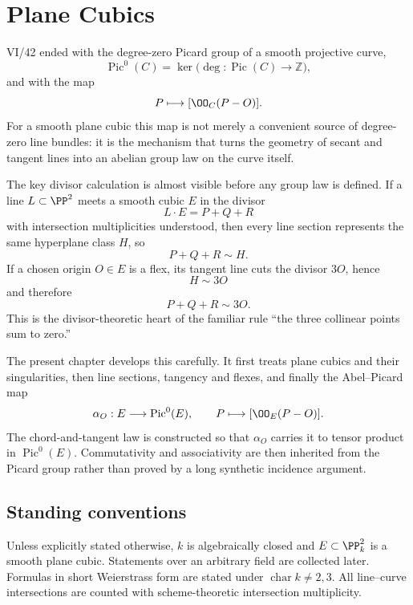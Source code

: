 \chapter{Plane Cubics}
\label{ch:vi43-plane-cubics}
\providecommand{\Pic}{\operatorname{Pic}}
\providecommand{\Div}{\operatorname{Div}}
\providecommand{\ord}{\operatorname{ord}}

VI/42 ended with the degree-zero Picard group of a smooth projective curve,
\[
  \Pic^0(C)=\ker\!\bigl(\deg:\Pic(C)\to\mathbb Z\bigr),
\]
and with the map
\[
  P\longmapsto [\OO_C(P-O)].
\]
For a smooth plane cubic this map is not merely a convenient source of degree-zero line bundles: it is the mechanism that turns the geometry of secant and tangent lines into an abelian group law on the curve itself.

The key divisor calculation is almost visible before any group law is defined.  If a line \(L\subset\PP^2\) meets a smooth cubic \(E\) in the divisor
\[
  L\cdot E=P+Q+R
\]
with intersection multiplicities understood, then every line section represents the same hyperplane class \(H\), so
\[
  P+Q+R\sim H.
\]
If a chosen origin \(O\in E\) is a flex, its tangent line cuts the divisor \(3O\), hence
\[
  H\sim 3O
\]
and therefore
\[
  \boxed{P+Q+R\sim 3O.}
\]
This is the divisor-theoretic heart of the familiar rule ``the three collinear points sum to zero.''

The present chapter develops this carefully.  It first treats plane cubics and their singularities, then line sections, tangency and flexes, and finally the Abel--Picard map
\[
  \alpha_O:E\longrightarrow\Pic^0(E),
  \qquad
  P\longmapsto[\OO_E(P-O)].
\]
The chord-and-tangent law is constructed so that \(\alpha_O\) carries it to tensor product in \(\Pic^0(E)\).  Commutativity and associativity are then inherited from the Picard group rather than proved by a long synthetic incidence argument.

\section*{Standing conventions}
Unless explicitly stated otherwise, \(k\) is algebraically closed and \(E\subset\PP^2_k\) is a smooth plane cubic.  Statements over an arbitrary field are collected later.  Formulas in short Weierstrass form are stated under \(\operatorname{char}k\neq2,3\).  All line--curve intersections are counted with scheme-theoretic intersection multiplicity.

